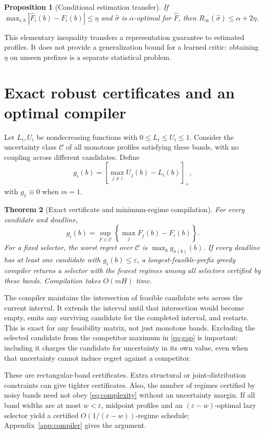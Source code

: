 \documentclass[11pt]{article}
\newtheorem{theorem}{Theorem}
\newtheorem{proposition}[theorem]{Proposition}
\theoremstyle{definition}\newtheorem{definition}[theorem]{Definition}
\newcommand{\eps}{\varepsilon}
\begin{document}
\begin{proposition}[Conditional estimation transfer]\label{prop:transfer}
If $\max_{i,b}|\widehat F_i(b)-F_i(b)|\le\eta$ and $\widehat\sigma$ is $\alpha$-optimal for $\widehat F$, then $R_\infty(\widehat\sigma)\le\alpha+2\eta$.
\end{proposition}
This elementary inequality transfers a representation guarantee to estimated profiles. It does not provide a generalization bound for a learned critic: obtaining $\eta$ on unseen prefixes is a separate statistical problem.

\section{Exact robust certificates and an optimal compiler}
Let $L_i,U_i$ be nondecreasing functions with $0\le L_i\le U_i\le1$. Consider the uncertainty class $\mathcal C$ of all monotone profiles satisfying these bands, with no coupling across different candidates. Define
\begin{equation}\label{eq:gap}
 g_i(b)=\left[\max_{j\ne i}U_j(b)-L_i(b)\right]_+,
\end{equation}
with $g_1\equiv0$ when $m=1$.

\begin{theorem}[Exact certificate and minimum-regime compilation]\label{thm:compiler}
For every candidate and deadline,
\begin{equation}
 g_i(b)=\sup_{F\in\mathcal C}\left\{\max_jF_j(b)-F_i(b)\right\}.
\end{equation}
For a fixed selector, the worst regret over $\mathcal C$ is $\max_bg_{\sigma(b)}(b)$. If every deadline has at least one candidate with $g_i(b)\le\eps$, a longest-feasible-prefix greedy compiler returns a selector with the fewest regimes among all selectors certified by these bands. Compilation takes $O(mH)$ time.
\end{theorem}
The compiler maintains the intersection of feasible candidate sets across the current interval. It extends the interval until that intersection would become empty, emits any surviving candidate for the completed interval, and restarts. This is exact for any feasibility matrix, not just monotone bands. Excluding the selected candidate from the competitor maximum in \eqref{eq:gap} is important: including it charges the candidate for uncertainty in its own value, even when that uncertainty cannot induce regret against a competitor.

These are rectangular-band certificates. Extra structural or joint-distribution constraints can give tighter certificates. Also, the number of regimes certified by noisy bands need not obey \eqref{eq:complexity} without an uncertainty margin. If all band widths are at most $w<\eps$, midpoint profiles and an $(\eps-w)$-optimal lazy selector yield a certified $O(1/(\eps-w))$-regime schedule; Appendix~\ref{app:compiler} gives the argument.
\end{document}
